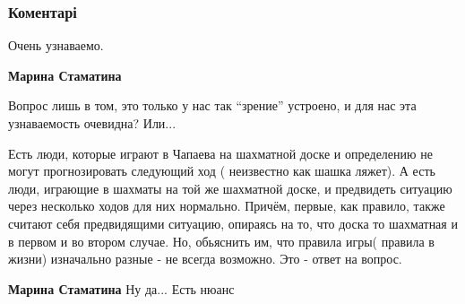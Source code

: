  
 
 
 
 
\subsubsection{Коментарі}
\label{sec:17_11_2019.fb.lozovskij_sergej.1.himera.cmt}

\begin{itemize} %
Очень узнаваемо.

\textbf{Марина Стаматина} 

Вопрос лишь в том, это только у нас так \enquote{зрение} устроено, и для нас эта
узнаваемость очевидна? Или...


Есть люди, которые играют в Чапаева на шахматной доске и определению не могут
прогнозировать следующий ход ( неизвестно как шашка ляжет). А есть люди,
играющие в шахматы на той же шахматной доске, и предвидеть ситуацию через
несколько ходов для них нормально. Причём, первые, как правило, также считают
себя предвидящими ситуацию, опираясь на то, что доска то шахматная и в первом и
во втором случае. Но, обьяснить им, что правила игры( правила в жизни)
изначально разные - не всегда возможно. Это - ответ на вопрос.


\textbf{Марина Стаматина} Ну да... Есть нюанс

\end{itemize} %
